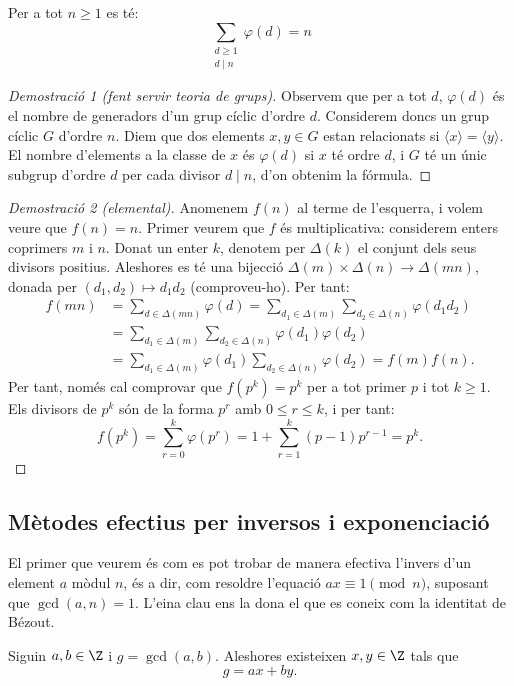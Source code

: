 \begin{proposition}
 Per a tot $n\geq 1$ es té:
 \[
 \sum_{\substack{d\geq 1\\d \mid n}}\varphi(d) = n
 \]
\end{proposition}
\begin{proof}[Demostració 1 (fent servir teoria de grups)]
Observem que per a tot $d$, $\varphi(d)$ és el nombre de generadors d'un grup cíclic d'ordre $d$. Considerem doncs un grup cíclic $G$ d'ordre $n$. Diem que dos elements $x,y\in G$ estan relacionats si $\langle x\rangle = \langle y \rangle$. El nombre d'elements a la classe de $x$ és $\varphi(d)$ si $x$ té ordre $d$, i $G$ té un únic subgrup d'ordre $d$ per cada divisor $d\mid n$, d'on obtenim la fórmula.
\end{proof}
\begin{proof}[Demostració 2 (elemental)]
 Anomenem $f(n)$ al terme de l'esquerra, i volem veure que $f(n)=n$. Primer veurem que $f$ és multiplicativa: considerem enters coprimers $m$ i $n$. Donat un enter $k$, denotem per $\Delta(k)$ el conjunt dels seus divisors positius. Aleshores es té una bijecció $\Delta(m)\times\Delta(n)\to \Delta(mn)$, donada per $(d_1,d_2)\mapsto d_1d_2$ (comproveu-ho). Per tant:
 \begin{align*}
 f(mn)&=\sum_{d\in\Delta(mn)}\varphi(d) = \sum_{d_1\in\Delta(m)}\sum_{d_2\in\Delta(n)}\varphi(d_1d_2)\\
 &=\sum_{d_1\in\Delta(m)}\sum_{d_2\in\Delta(n)}\varphi(d_1)\varphi(d_2)\\
 &=\sum_{d_1\in\Delta(m)}\varphi(d_1)\sum_{d_2\in\Delta(n)}\varphi(d_2) = f(m)f(n).
 \end{align*}
 Per tant, només cal comprovar que $f(p^k) = p^k$ per a tot primer $p$ i tot $k\geq 1$. Els divisors de $p^k$ són de la forma $p^r$ amb $0\leq r \leq k$, i per tant:
\[
f(p^k) = \sum_{r=0}^k \varphi(p^r) = 1+\sum_{r=1}^k (p-1)p^{r-1} = p^k.
\]
\end{proof}
 \subsection{Mètodes efectius per inversos i exponenciació}
 El primer que veurem és com es pot trobar de manera efectiva l'invers d'un element $a$ mòdul $n$, és a dir, com resoldre l'equació $ax\equiv 1\pmod{n}$, suposant que $\gcd(a,n)=1$. L'eina clau ens la dona el que es coneix com la identitat de Bézout.
 
 \begin{proposition}
 \label{prop:xgcd}
  Siguin $a,b\in\Z$ i $g=\gcd(a,b)$. Aleshores existeixen $x,y\in\Z$ tals que
  \begin{equation}
  \label{prop:bezout}
  g=ax+by.
  \end{equation}
 \end{proposition}
 
